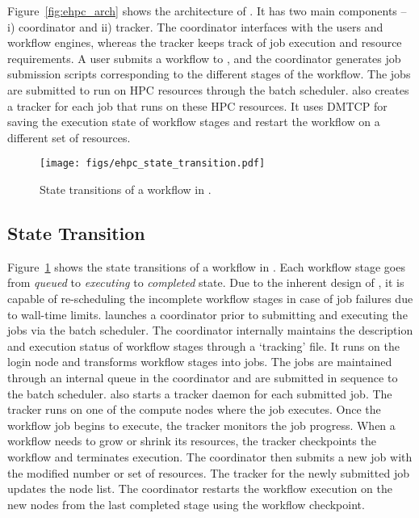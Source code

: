 
Figure~\ref{fig:ehpc_arch} shows the architecture of \systemname. It has two main
components -- i) coordinator and ii) tracker. The coordinator interfaces with
the users and workflow engines, whereas the tracker keeps track of job
execution and resource requirements. A user submits a workflow to \systemname,
and the coordinator generates job submission scripts corresponding
to the different stages of the workflow. The jobs are submitted to run on
HPC resources through the batch scheduler. \systemname also creates a
tracker for each job that runs on these HPC resources. It uses DMTCP for
saving the execution state of workflow stages and restart the workflow
on a different set of resources.

\begin{figure} [htbp]
\begin{center}
    \texttt{[image: figs/ehpc\_state\_transition.pdf]}
\end{center}
 \caption{\small State transitions of a workflow in \systemname.}
 \label{fig:ehpc_state_transition}
\end{figure}

\subsection{State Transition}
Figure~\ref{fig:ehpc_state_transition} shows the state transitions of a workflow
in \systemname. Each workflow stage goes from \emph{queued} to \emph{executing}
to \emph{completed} state. Due to the inherent design of \systemname, it is
capable of re-scheduling the incomplete workflow stages in case of job failures
due to wall-time limits. \systemname launches a coordinator prior to submitting
and executing the jobs via the batch scheduler. The coordinator internally
maintains the description and execution status of workflow stages through a
`tracking' file. It runs on the login node and transforms workflow stages into
jobs. The jobs are maintained through an internal queue in the coordinator and
are submitted in sequence to the batch scheduler. \systemname also starts a
tracker daemon for each submitted job. The tracker runs on one of the compute
nodes where the job executes. Once the workflow job begins to execute, the
tracker monitors the job progress. When a workflow needs to grow or shrink its
resources, the tracker checkpoints the workflow and terminates execution. The
coordinator then submits a new job with the modified number or set of resources.
The tracker for the newly submitted job updates the node list. The coordinator
restarts the workflow execution on the new nodes from the last completed stage
using the workflow checkpoint.

